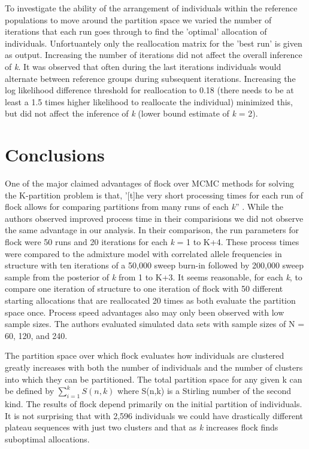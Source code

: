 To investigate the ability of the arrangement of individuals within the reference 
populations to move around the partition space we varied the number of iterations that 
each run goes through to find the 'optimal' allocation of individuals. Unfortuantely 
only the reallocation matrix for the 'best run' is given as output. Increasing the 
number of iterations did not affect the overall inference of \textit{k}. It was 
observed that often during the last iterations individuals would alternate between 
reference groups during subsequent iterations. Increasing the log likelihood 
difference threshold for reallocation to 0.18 (there needs to be at least a 1.5 times 
higher likelihood to reallocate the individual) minimized this, but did not affect the 
inference of \textit{k} (lower bound estimate of \textit{k} = 2). 


\section*{Conclusions}

One of the major claimed advantages of {\sc flock} over MCMC methods for solving the 
K-partition problem is that, '[t]he very short processing times for each run of {\sc flock} allows for
 comparing partitions from many runs of each \textit{k}'' \citep[][p.~735]{Duc&Tur2012}.
While the authors observed improved process time in their 
comparisions we did not observe the same advantage in our analysis. In their comparison, the 
run parameters for {\sc flock} were 50 runs and 20 iterations for each \textit{k} = 1 to K+4. 
These process times were compared to the admixture model with correlated allele 
frequencies in {\sc structure} with ten iterations of a 50,000 sweep burn-in followed 
by 200,000 sweep sample from the posterior of \textit{k} from 1 to K+3. 
It seems reasonable, for each \textit{k}, to compare one iteration of {\sc structure} 
to one iteration of {\sc flock} with 50 different starting allocations that are reallocated 20 times 
as both evaluate the partition space once. Process speed advantages also may only been observed 
with low sample sizes. The authors evaluated simulated data sets with sample sizes of N = 60, 120, 
and 240. 

The partition space over which {\sc flock} evaluates how individuals are clustered 
greatly increases with both the number of individuals and the number of clusters into 
which they can be partitioned. The total partition space for any given k can be 
defined by $\sum\limits_{i=1}^k S(n,k)$ where S(n,k) is a Stirling number of the 
second kind. The results of {\sc flock} depend primarily on the initial partition of 
individuals. It is not surprising that with 2,596 individuals we could have 
drastically different plateau sequences with just two clusters and that as \textit{k} increases
{\sc flock} finds suboptimal allocations. 

